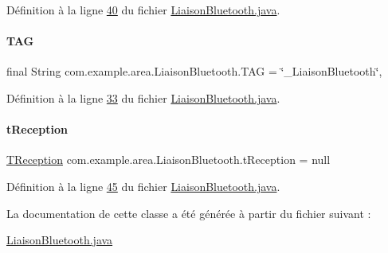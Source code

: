 Définition à la ligne \hyperlink{_liaison_bluetooth_8java_source_l00040}{40} du fichier \hyperlink{_liaison_bluetooth_8java_source}{Liaison\+Bluetooth.\+java}.

\mbox{\label{classcom_1_1example_1_1area_1_1_liaison_bluetooth_ac51aa4b63fae5c36734a061cc05d7fc9}} 
\paragraph{\texorpdfstring{T\+AG}{TAG}}
{\footnotesize\ttfamily final String com.\+example.\+area.\+Liaison\+Bluetooth.\+T\+AG = \char`\"{}\+\_\+\+Liaison\+Bluetooth\char`\"{}\hspace{0.3cm}{\ttfamily [static]}, {\ttfamily [private]}}



Définition à la ligne \hyperlink{_liaison_bluetooth_8java_source_l00033}{33} du fichier \hyperlink{_liaison_bluetooth_8java_source}{Liaison\+Bluetooth.\+java}.

\mbox{\label{classcom_1_1example_1_1area_1_1_liaison_bluetooth_ae3ef79eced8ab42b066b624108860d48}} 
\paragraph{\texorpdfstring{t\+Reception}{tReception}}
{\footnotesize\ttfamily \hyperlink{classcom_1_1example_1_1area_1_1_liaison_bluetooth_1_1_t_reception}{T\+Reception} com.\+example.\+area.\+Liaison\+Bluetooth.\+t\+Reception = null\hspace{0.3cm}{\ttfamily [private]}}



Définition à la ligne \hyperlink{_liaison_bluetooth_8java_source_l00045}{45} du fichier \hyperlink{_liaison_bluetooth_8java_source}{Liaison\+Bluetooth.\+java}.



La documentation de cette classe a été générée à partir du fichier suivant \+:\begin{DoxyCompactItemize}
\item 
\hyperlink{_liaison_bluetooth_8java}{Liaison\+Bluetooth.\+java}\end{DoxyCompactItemize}
